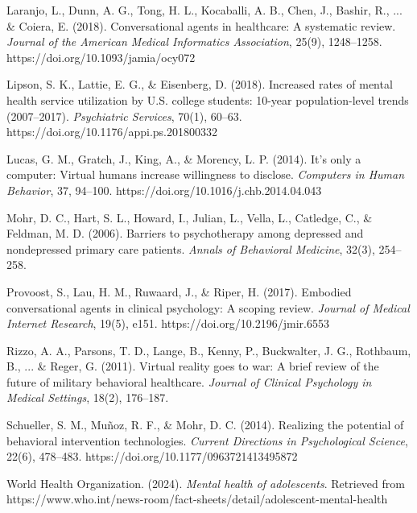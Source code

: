 \documentclass[11pt,a4paper]{report}
\begin{document}
\begin{enumerate}[label={[\arabic*]}, leftmargin=1.5cm, itemsep=3pt, parsep=0pt]
\item Laranjo, L., Dunn, A. G., Tong, H. L., Kocaballi, A. B., Chen, J., Bashir, R., ... \& Coiera, E. (2018). Conversational agents in healthcare: A systematic review. \textit{Journal of the American Medical Informatics Association}, 25(9), 1248–1258. https://doi.org/10.1093/jamia/ocy072

\item Lipson, S. K., Lattie, E. G., \& Eisenberg, D. (2018). Increased rates of mental health service utilization by U.S. college students: 10-year population-level trends (2007–2017). \textit{Psychiatric Services}, 70(1), 60–63. https://doi.org/10.1176/appi.ps.201800332

\item Lucas, G. M., Gratch, J., King, A., \& Morency, L. P. (2014). It's only a computer: Virtual humans increase willingness to disclose. \textit{Computers in Human Behavior}, 37, 94–100. https://doi.org/10.1016/j.chb.2014.04.043

\item Mohr, D. C., Hart, S. L., Howard, I., Julian, L., Vella, L., Catledge, C., \& Feldman, M. D. (2006). Barriers to psychotherapy among depressed and nondepressed primary care patients. \textit{Annals of Behavioral Medicine}, 32(3), 254–258.

\item Provoost, S., Lau, H. M., Ruwaard, J., \& Riper, H. (2017). Embodied conversational agents in clinical psychology: A scoping review. \textit{Journal of Medical Internet Research}, 19(5), e151. https://doi.org/10.2196/jmir.6553

\item Rizzo, A. A., Parsons, T. D., Lange, B., Kenny, P., Buckwalter, J. G., Rothbaum, B., ... \& Reger, G. (2011). Virtual reality goes to war: A brief review of the future of military behavioral healthcare. \textit{Journal of Clinical Psychology in Medical Settings}, 18(2), 176–187.

\item Schueller, S. M., Muñoz, R. F., \& Mohr, D. C. (2014). Realizing the potential of behavioral intervention technologies. \textit{Current Directions in Psychological Science}, 22(6), 478–483. https://doi.org/10.1177/0963721413495872

\item World Health Organization. (2024). \textit{Mental health of adolescents}. Retrieved from https://www.who.int/news-room/fact-sheets/detail/adolescent-mental-health

\end{enumerate}
\end{document}

